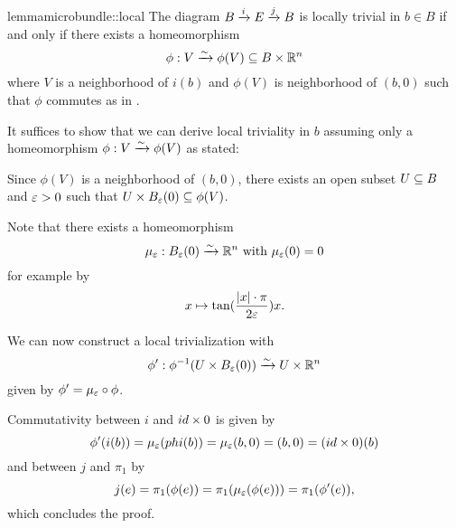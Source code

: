 \begin{myparagraph}
        
\end{myparagraph}

\begin{mystatement}{lemma}{microbundle::local}
    The diagram $\bundle{B}{E}{i}{j}$ is locally trivial in $b \in B$
    if and only if there exists a homeomorphism
    \[ \phi: V \isomto \phi(V) \sub B \times \R^n \]
    where $V$ is a neighborhood of $i(b)$ and $\phi(V)$
    is neighborhood of $(b, 0)$ such that $\phi$ commutes
    as in .
\end{mystatement}

\begin{myproof}
    It suffices to show that we can derive local triviality in $b$
    assuming only a homeomorphism $\phi: V \isomto \phi(V)$ as stated:

    Since $\phi(V)$ is a neighborhood of $(b, 0)$,
    there exists an open subset $U \sub B$ and $\eps > 0$ such
    that $U \times \ball[\eps] \sub \phi(V)$.

    Note that there exists a homeomorphism
    \[ \mu_\eps: \ball[\eps] \isomto \R^n \twith \mu_\eps(0) = 0 \]
    for example by
    \[ x \mapsto \tan(\frac{\abs{x}\cdot\pi}{2\eps}) x. \]

    We can now construct a local trivialization with
    \[ \phi': \inv{\phi}(U \times \ball[\eps]) \isomto U \times \R^n \]
    given by $\phi' = \mu_\eps \circ \phi$.

    Commutativity between $i$ and $id \cross 0$ is given by
    \[ \phi'(i(b)) = \mu_\eps(phi(b)) = \mu_\eps(b, 0) = (b, 0) = (id \cross 0)(b) \]
    and between $j$ and $\pi_1$ by
    \[ j(e) = \pi_1(\phi(e)) = \pi_1(\mu_\eps(\phi(e))) = \pi_1(\phi'(e)), \]
    which concludes the proof.
\end{myproof}